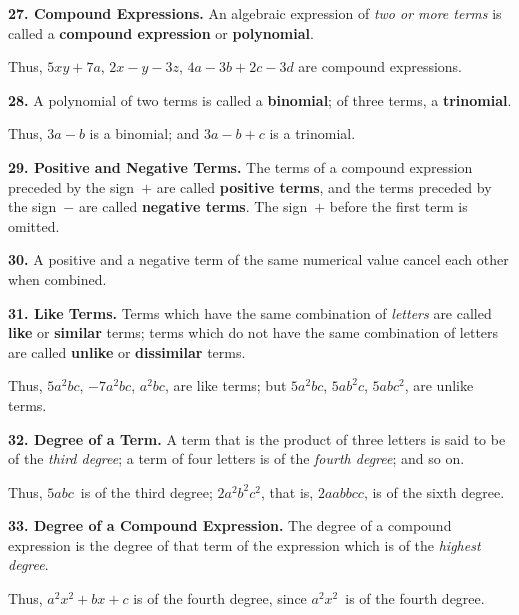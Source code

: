 \documentclass[12pt]{book}[2005/09/16]
\newcommand{\Paragraph}[1]{\medskip\par\textbf{#1}}
\newcommand{\Defn}[1]{\textbf{#1}}
\newenvironment{Remark}[1][]{\par\small\textsc{#1}}{\par}
\begin{document}
\Paragraph{27.  Compound Expressions.}  An algebraic expression of
\emph{two or more terms} is called a \Defn{compound expression} or \Defn{polynomial}.

\begin{Remark}
Thus, $5xy + 7a$, $2x - y - 3z$, $4a - 3b + 2c - 3d$ are compound
expressions.
\end{Remark}

\Paragraph{28.}  A polynomial of two terms is called a \Defn{binomial}; of
three terms, a \Defn{trinomial}.

\begin{Remark}
Thus, $3a - b$ is a binomial; and $3a - b + c$ is a trinomial.
\end{Remark}

\Paragraph{29.  Positive and Negative Terms.}  The terms of a compound
expression preceded by the sign~$+$ are called \Defn{positive
terms}, and the terms preceded by the sign~$-$ are called
\Defn{negative terms}.  The sign~$+$ before the first term is omitted.

\Paragraph{30.}  A positive and a negative term of the same numerical
value cancel each other when combined.

\Paragraph{31.  Like Terms.}  Terms which have the same combination
of \emph{letters} are called \Defn{like} or \Defn{similar} terms; terms which
do not have the same combination of letters are called
\Defn{unlike} or \Defn{dissimilar} terms.

\begin{Remark}
Thus, $5a^{2}bc$, $-7a^{2}bc$, $a^{2}bc$, are like terms; but $5a^{2}bc$, $5ab^{2}c$,
$5abc^{2}$, are unlike terms.
\end{Remark}

\Paragraph{32.  Degree of a Term.}  A term that is the product of
three letters is said to be of the \emph{third degree}; a term of
four letters is of the \emph{fourth degree}; and so on.

\begin{Remark}
Thus, $5abc$~is of the third degree; $2a^{2}b^{2}c^{2}$, that is, $2aabbcc$, is of
the sixth degree.
\end{Remark}

\Paragraph{33.  Degree of a Compound Expression.}  The degree of a
compound expression is the degree of that term of the
expression which is of the \emph{highest degree}.

\begin{Remark}
Thus, $a^{2}x^{2} + bx + c$ is of the fourth degree, since $a^{2}x^{2}$~is of the
fourth degree.
\end{Remark}
\end{document}
